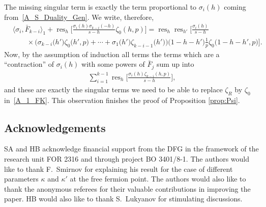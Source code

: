 \documentclass[pdftex]{sigma}
\numberwithin{equation}{section}
\DeclareMathOperator{\res}{res}
\begin{document}
The missing singular term is exactly the term proportional to $\sigma_i(h)$ coming from~\eqref{A_S_Duality_Gen}. We write, therefore,
\begin{align*}
&\bigl\langle \sigma_i, \bar{F}_{k-i} \bigr\rangle_1 + \res_h \biggl[ \frac{\sigma_i(h) \sigma_{k-i}(-h)}{s-h} \zeta_0(h, p)\biggr] = \res_h\res_{h'} \biggl[ \frac{\sigma_i(h)}{s-h}\\
&\qquad{}\times\bigl(\sigma_{k-i}\bigl(h'\bigr)\zeta_0\bigl(h', p\bigr) + \cdots + \sigma_1\bigl(h'\bigr)\zeta_{k-i-1}\bigl(h'\bigr)\bigr)\bigl(1-h-h'\bigr)\frac{1}{p}\zeta_0\bigl(1-h-h', p\bigr) \biggr].
\end{align*}
Now, by the assumption of induction all terms the terms which are a ``contraction'' of $\sigma_i(h)$ with some powers of $\bar{F}_j$ sum up into
\begin{align*}
\sum_{i=1}^{k-1} \res_h\biggl[\frac{\sigma_i(h) \zeta_{k-i}(h, p)}{s-h} \biggr],
\end{align*}
and these are exactly the singular terms we need to be able to replace $\zeta_R$ by $\zeta_0$ in~\eqref{A_1_FK}. This observation finishes the proof of Proposition \ref{prop:Psi}.

\subsection*{Acknowledgements}
SA and HB acknowledge financial support from the DFG in the framework of the research unit FOR 2316 and through project BO 3401/8-1. The authors would like to thank F.~Smirnov for explaining his result for the case of different parameters $\kappa$ and $\kappa'$ at the free fermion point. The authors would also like to thank the anonymous referees for their valuable contributions in improving the paper. HB would also like to thank S.~Lukyanov for stimulating discussions.
\end{document}
